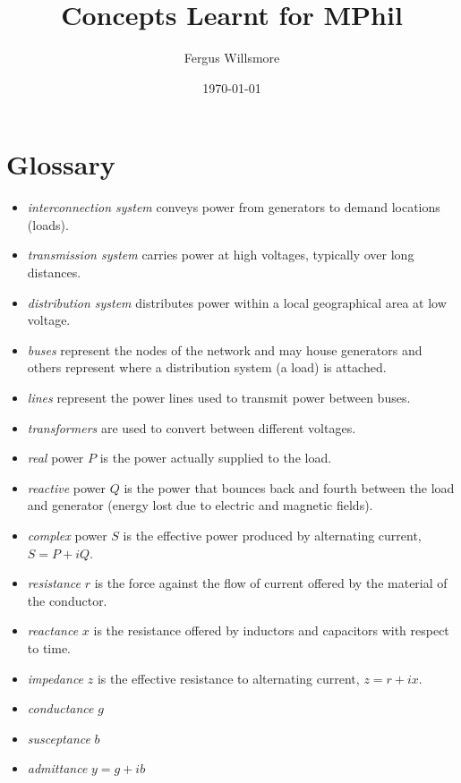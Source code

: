 \documentclass{article}
\title{Concepts Learnt for MPhil}
\author{Fergus Willsmore}
\date{\today}
\begin{document}
\maketitle

\newpage

\tableofcontents

\newpage

\section{Glossary}

\begin{itemize}
\item[] {\it interconnection system} conveys power from generators to demand locations (loads). 
\item[] {\it transmission system} carries power at high voltages, typically over long distances. 
\item[] {\it distribution system} distributes power within a local geographical area at low voltage. 
\item[] {\it buses} represent the nodes of the network and may house generators and others represent where a distribution system (a load) is attached.
\item[] {\it lines} represent the power lines used to transmit power between buses.
\item[] {\it transformers} are used to convert between different voltages.
\item[] {\it real} power $P$ is the power actually supplied to the load.
\item[] {\it reactive} power $Q$ is the power that bounces back and fourth between the load and generator (energy lost due to electric and magnetic fields).
\item[] {\it complex} power $S$ is the effective power produced by alternating current, $S=P+iQ$.
\item[] {\it resistance} $r$ is the force against the flow of current offered by the material of the conductor.
\item[] {\it reactance} $x$ is the resistance offered by inductors and capacitors with respect to time.
\item[] {\it impedance} $z$ is the effective resistance to alternating current, $z=r+ix$. 
\item[] {\it conductance} $g$
\item[] {\it susceptance} $b$
\item[] {\it admittance} $y=g+ib$

\end{itemize}
\end{document}
